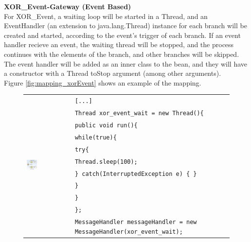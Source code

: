 \textbf{XOR\_Event-Gateway (Event Based)}\\
For XOR\_Event, a waiting loop will be started in a Thread, and an EventHandler (an extension to java.lang.Thread) instance for each branch will be created and started, according to the event's trigger of each branch. If an event handler recieve an event, the waiting thread will be stopped, and the process continues with the elements of the branch, and other branches will be skipped. The event handler will be added as an inner class to the bean, and they will have a constructor with a Thread toStop argument (among other arguments). \\
Figure \ref{fig:mapping_xorEvent} shows an example of the mapping.

\begin{figure}[h]
\begin{tabularx}{\linewidth}{lcX}
	\multirow{26}{*}{\includegraphics[width=0.3\textwidth]{images/mapping/xor-event.png}} &  & \texttt{[...]}\\
	& & \texttt{Thread xor\_event\_wait = new Thread()\{}\\
	& & \texttt{\hspace{10pt}public void run()\{}\\
	& & \texttt{\hspace{20pt}while(true)\{}\\
	& & \texttt{\hspace{30pt}try\{}\\
	& & \texttt{\hspace{40pt}Thread.sleep(100);}\\
	& & \texttt{\hspace{30pt}\} catch(InterruptedException e) \{ \}}\\
	& & \texttt{\hspace{20pt}\}}\\
	& & \texttt{\hspace{10pt}\}}\\
	& & \texttt{\};}\\
	& & \texttt{MessageHandler messageHandler = new MessageHandler(xor\_event\_wait);}\\

\end{tabularx}
\end{figure}
